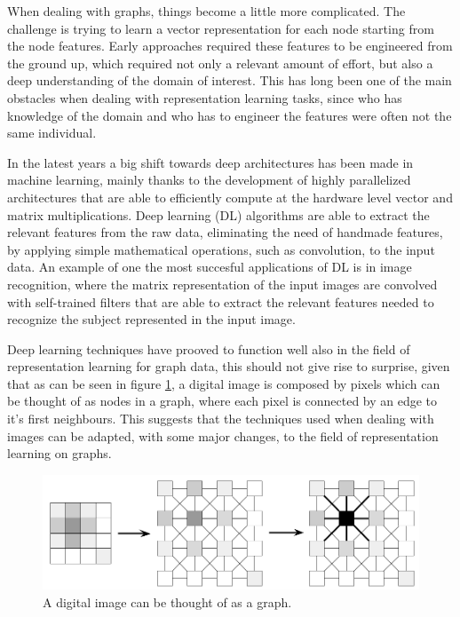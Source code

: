 \documentclass[%
    corpo=13.5pt,
    twoside,
    oldstyle,
    tipotesi=magistrale,
    greek,
    evenboxes
]{toptesi}
\begin{document}
When dealing with graphs, things become a little more complicated. The
challenge is trying to learn a vector representation for each node
starting from the node features. Early approaches required these
features to be engineered from the ground up, which
required not only a relevant amount of effort, but also a deep
understanding of the domain of interest. This has long been one of the
main obstacles when dealing with representation learning tasks, since who
has knowledge of the domain and who has to engineer the features were
often not the same individual.

In the latest years a big shift towards deep architectures has been made
in machine learning, mainly thanks to the development of highly
parallelized architectures that are able to efficiently compute
at the hardware level vector and matrix multiplications.
Deep learning (DL) algorithms are able to extract the relevant features from
the raw data, eliminating the need of handmade features, by applying simple
mathematical operations, such as convolution, to the input data.
An example of one the most succesful applications of DL is in
image recognition, where the matrix representation of the input
images are convolved with self-trained filters that are able to
extract the relevant features needed to recognize the subject represented
in the input image.

Deep learning techniques have prooved to function well also in the field of
representation learning for graph data, this should not give rise to surprise,
given that as can be seen in figure \ref{fig:pixels-as-graph}, a digital image
is composed by pixels which can be thought of as nodes in a graph, where
each pixel is connected by an edge to it's first neighbours. This suggests that
the techniques used when dealing with images can be adapted, with
some major changes, to the field of representation learning on graphs.

\begin{figure}[h]
    \centering
    \includegraphics[scale=0.4]{img/pixels-as-graph.png}
    \caption{A digital image can be thought of as a graph.}
    \label{fig:pixels-as-graph} %
    \end{figure}
\end{document}
